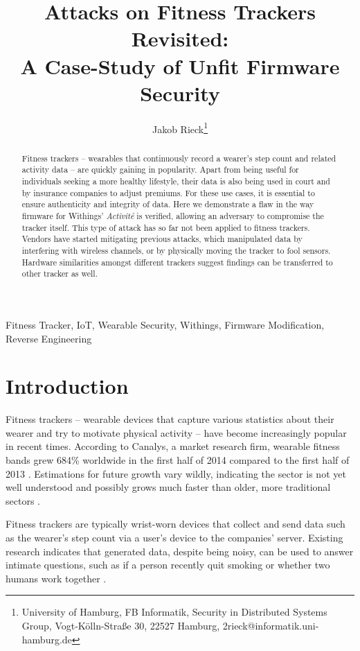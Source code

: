 \documentclass[english]{lni}
\author{Jakob Rieck\footnote{University of Hamburg, FB Informatik, Security in Distributed Systems Group, Vogt-Kölln-Straße 30, 22527 Hamburg, 2rieck@informatik.uni-hamburg.de}}
\title{Attacks on Fitness Trackers Revisited:\\ A Case-Study of Unfit Firmware Security}
\begin{document}
\maketitle
\setcounter{footnote}{1}

\begin{abstract}
Fitness trackers -- wearables that continuously record a wearer's step count and related activity data -- are quickly gaining in popularity. Apart from being useful for individuals seeking a more healthy lifestyle, their data is also being used in court and by insurance companies to adjust premiums. For these use cases, it is essential to ensure authenticity and integrity of data. Here we demonstrate a flaw in the way firmware for Withings' \emph{Activité} is verified, allowing an adversary to compromise the tracker itself. This type of attack has so far not been applied to fitness trackers. Vendors have started mitigating previous attacks, which manipulated data by interfering with wireless channels, or by physically moving the tracker to fool sensors. Hardware similarities amongst different trackers suggest findings can be transferred to other tracker as well.
\end{abstract}
\begin{keywords}
Fitness Tracker, IoT, Wearable Security, Withings, Firmware Modification, Reverse Engineering
\end{keywords}

\section{Introduction}
\label{introduction}

Fitness trackers -- wearable devices that capture various statistics about their wearer and try to motivate physical activity -- have become increasingly popular in recent times. According to Canalys, a market research firm, wearable fitness bands grew 684\% worldwide in the first half of 2014 compared to the first half of 2013 \cite{canalys}. Estimations for future growth vary wildly, indicating the sector is not yet well understood and possibly grows much faster than older, more traditional sectors \cite{Wei14}.

Fitness trackers are typically wrist-worn devices that collect and send data such as the wearer's step count via a user's device to the companies' server. Existing research indicates that generated data, despite being noisy, can be used to answer intimate questions, such as if a person recently quit smoking \cite{Ka14} or whether two humans work together \cite{tsubouchi2013working}.
\end{document}
